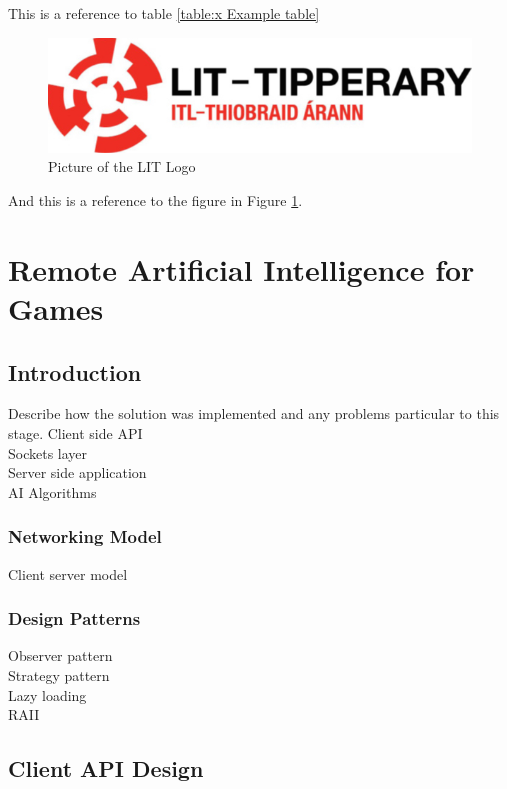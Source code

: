 \documentclass[12pt,a4paper,titlepage]{article}
\begin{document}
This is a reference to table \ref{table:x Example table}

\begin{figure}[H]
	\centering
    	\includegraphics[width=\textwidth]{Figures/lit_logo}
	\caption{Picture of the LIT Logo}
	\label{fig:example figure and caption}
\end{figure}

And this is a reference to the figure in Figure \ref{fig:example figure and caption}.

\section{Remote Artificial Intelligence for Games}

\subsection{Introduction}

Describe how the solution was implemented and any problems particular to this stage.
Client side API\\
Sockets layer\\
Server side application\\
AI Algorithms\\

\subsubsection{Networking Model}

Client server model\\

\subsubsection{Design Patterns}
Observer pattern\\
Strategy pattern\\
Lazy loading\\
RAII\\

\subsection{Client API Design}
\label{section:clientapidesign}
\end{document}
